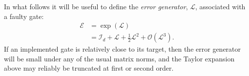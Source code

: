 \documentclass[aps,nofootinbib,pra,notitlepage,twocolumn]{revtex4-1}
\newcommand{\order}[1]{\mathcal{O}\left( #1 \right)}
\newcommand{\errmat}{\ensuremath{{\mathcal{E}}}}
\newcommand{\genmat}{\ensuremath{{\mathcal{L}}}}
\newcommand{\identmat}{\ensuremath{\mathcal{I}}}
\newcommand{\0}{\ensuremath{\mathbf{0}}}
\begin{document}

In what follows it will be useful to define the \emph{error generator}, $\genmat$, associated with a faulty gate: 
\begin{align}
	\errmat 
		&= \exp\left(\genmat\right) \\
	\label{eq:generator}
		&= \identmat_d + \genmat + \frac{1}{2}\genmat^2 + \order{\genmat^3}.
\end{align}
If an implemented gate is relatively close to its target, then the error generator will be small under any of the usual matrix norms, and the Taylor expansion above may reliably be truncated at first or second order. 
\end{document}
